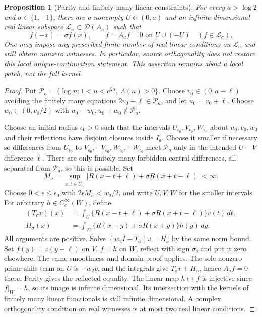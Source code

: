 \documentclass[11pt]{article}
\newtheorem{proposition}[theorem]{Proposition}
\theoremstyle{remark}
\begin{document}
\begin{proposition}[Parity and finitely many linear constraints]
\label{prop:ns55-parity-ucp-counterexample}
For every $a>\log2$ and $\sigma\in\{1,-1\}$, there are a nonempty
$U\Subset(0,a)$ and an infinite-dimensional real linear subspace
$\mathcal L_\sigma\subset\mathcal D(A_a)$ such that
\[
 f(-x)=\sigma f(x),\qquad f=A_af=0\text{ on }U\cup(-U)
 \quad(f\in\mathcal L_\sigma).
\]
One may impose any prescribed finite number of real linear conditions
on $\mathcal L_\sigma$ and still obtain nonzero witnesses. In particular,
source orthogonality does not restore this local unique-continuation
statement. This assertion remains about a local patch, not the full kernel.
\end{proposition}
\begin{proof}
Put $\mathcal P_a=\{\log n:1<n<e^{2a},\ \Lambda(n)>0\}$.
Choose $v_0\in(0,a-\ell)$ avoiding the finitely many equations
$2v_0+\ell\in\mathcal P_a$, and let $u_0=v_0+\ell$.
Choose $w_0\in(0,v_0/2)$ with
$u_0-w_0,u_0+w_0\notin\mathcal P_a$.

Choose an initial radius $\epsilon_0>0$ such that the intervals
$U_{\epsilon_0},V_{\epsilon_0},W_{\epsilon_0}$ about $u_0,v_0,w_0$
and their reflections have disjoint closures inside $I_a$.
Choose it smaller if necessary so differences from $U_{\epsilon_0}$
to $V_{\epsilon_0},-V_{\epsilon_0},W_{\epsilon_0},-W_{\epsilon_0}$
meet $\mathcal P_a$ only in the intended $U-V$ difference $\ell$.
There are only finitely many forbidden central differences, all
separated from $\mathcal P_a$, so this is possible. Set
\[
 M_\sigma=\sup_{x,t\in\overline{U_{\epsilon_0}}}
  |R(x-t+\ell)+\sigma R(x+t-\ell)|<\infty .
\]
Choose $0<\epsilon\le\epsilon_0$ with
$2\epsilon M_\sigma<w_2/2$, and write $U,V,W$ for the smaller intervals.
For arbitrary $h\in C_c^\infty(W)$, define
\begin{align*}
 (T_\sigma v)(x)&=\int_U
       \{R(x-t+\ell)+\sigma R(x+t-\ell)\}v(t)\,dt,\\
 H_\sigma(x)&=\int_W
       \{R(x-y)+\sigma R(x+y)\}h(y)\,dy .
\end{align*}
All arguments are positive. Solve
$(w_2I-T_\sigma)v=H_\sigma$ by the same norm bound.
Set $f(y)=v(y+\ell)$ on $V$, $f=h$ on $W$, reflect with sign $\sigma$,
and put it zero elsewhere. The same smoothness and domain proof applies.
The sole nonzero prime-shift term on $U$ is $-w_2v$, and the integrals
give $T_\sigma v+H_\sigma$, hence $A_af=0$ there. Parity gives the
reflected equality. The linear map $h\mapsto f$ is injective since
$f|_W=h$, so its image is infinite dimensional. Its intersection with
the kernels of finitely many linear functionals is still infinite
dimensional. A complex orthogonality condition on real witnesses is
at most two real linear conditions.
\end{proof}
\end{document}
